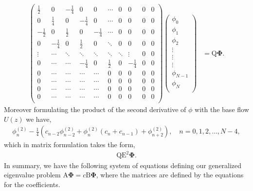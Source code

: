 \documentclass[a4paper, 12pt, twoside, openright]{article}
\numberwithin{equation}{section}
\begin{document}
\begin{align} 
\begin{pmatrix}
\frac{1}{2} & 0 & -\frac{1}{4} & 0 & 0 & \cdots & 0 & 0 & 0 & 0\\
0 & \frac{1}{4} & 0 & -\frac{1}{4} & 0 & \cdots & 0 & 0 & 0 & 0\\
-\frac{1}{2} & 0 & \frac{1}{2} & 0 & -\frac{1}{4} & \cdots & 0 & 0 & 0 & 0\\
0 & -\frac{1}{4} & 0 & \frac{1}{2} & 0 & \ddots & 0 & 0 & 0 & 0\\ 
\vdots & \cdots & \ddots & \ddots & \ddots & \ddots & \ddots & \vdots & 0 & 0\\
0 & \cdots &\cdots & -\frac{1}{4} & 0 & \frac{1}{2} & 0 & -\frac{1}{4} & 0 & 0 \\
0 & \cdots & \cdots & \cdots & \cdots & 0 & 0 & 0 & 0 & 0\\ 
0 & \cdots & \cdots & \cdots & \cdots & 0 & 0 & 0 & 0 & 0\\
0 & \cdots & \cdots & \cdots & \cdots & 0 & 0 & 0 & 0 & 0\\ 
0 & \cdots & \cdots & \cdots & \cdots & 0 & 0 & 0 & 0 & 0\\
\end{pmatrix} 
\begin{pmatrix}
\phi_0 \\
\phi_1 \\
\phi_2 \\
\vdots \\
\vdots \\
\vdots \\
\phi_{N-1} \\
\phi_{N} \\ 
\end{pmatrix}
&= \mathrm{Q}\mathbf{\Phi}.
\end{align}
Moreover formulating the product of the second derivative of $\phi$ with the base flow $U(z)$ we have,
\begin{align}
\phi_n^{(2)} - \frac{1}{4}\left(c_{n-2}\phi_{n-2}^{(2)}+\phi_n^{(2)}\left(c_n + c_{n-1}\right)+\phi_{n+2}^{(2)}\right), \quad n=0,1,2,\dots, N-4, 
\end{align}
which in matrix formulation takes the form,
\begin{align}
\mathrm{Q}\mathrm{E}^2\mathbf{\Phi}. 
\end{align}
In summary, we have the following system of equations defining our generalized eigenvalue problem $\mathrm{A}\mathbf{\Phi}=c\mathrm{B}\mathbf{\Phi}$, where the matrices are defined by the equations for the coefficients.
\end{document}
